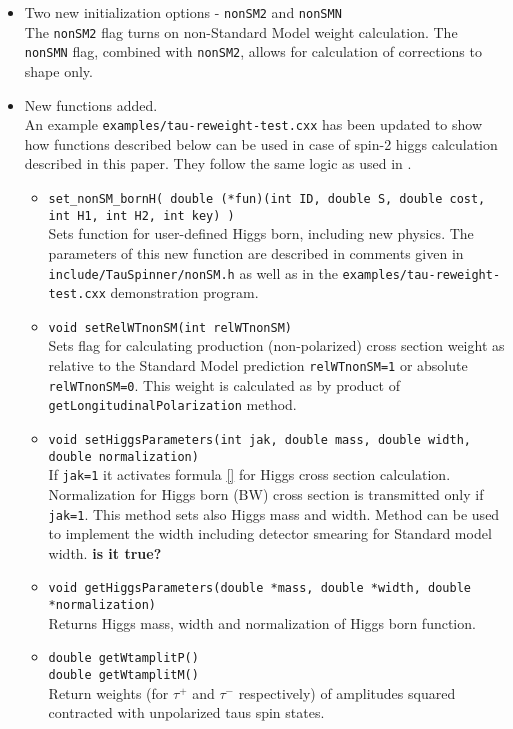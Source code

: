 \documentclass[12pt]{article}
\begin{document}
\begin{itemize}
\item Two new initialization options - {\tt nonSM2} and {\tt nonSMN} \\
      The {\tt nonSM2} flag turns on non-Standard Model weight calculation.
      The {\tt nonSMN} flag, combined with {\tt nonSM2}, allows for calculation
      of corrections to shape only.
\item New functions added. \\
      An example {\tt examples/tau-reweight-test.cxx} has been updated to show
      how functions described below can be used in case of spin-2 higgs calculation
      described in this paper. They follow the same logic as used in \cite{SPIN2_PAPER}.
      \begin{itemize}
      \item {\tt set\_nonSM\_bornH( double (*fun)(int ID, double S, double cost, int H1, int H2, int key) ) } \\
            Sets function for user-defined Higgs born, including new physics.
            The parameters of this new function are described in comments given in {\tt include/TauSpinner/nonSM.h}
            as well as in the {\tt examples/tau-reweight-test.cxx} demonstration program.
      \item {\tt void setRelWTnonSM(int relWTnonSM) } \\
            Sets flag for calculating production (non-polarized) cross section weight as relative to the Standard Model prediction {\tt   relWTnonSM=1}
  or absolute {\tt   relWTnonSM=0}. This weight is 
            calculated as by product of  {\tt getLongitudinalPolarization} method.
      \item {\tt void setHiggsParameters(int jak, double mass, double width, double normalization) } \\
             If {\tt jak=1} it activates formula \ref{} for Higgs cross 
             section calculation. 
             Normalization for Higgs born (BW) cross section is transmitted
             only if {\tt jak=1}. This method  sets also Higgs mass and  width. 
             Method can be used to implement 
             the width including detector smearing for  Standard model width.
             {\bf is it true?}
      \item {\tt void getHiggsParameters(double *mass, double *width, double *normalization) } \\
            Returns Higgs mass, width and normalization of Higgs born function.
      \item {\tt double getWtamplitP() } \\
            {\tt double getWtamplitM() } \\
            Return  weights  (for $\tau^+$ and $\tau^-$ respectively) 
            of amplitudes squared contracted  with unpolarized taus spin states.
      \end{itemize}
\end{itemize}
\end{document}

